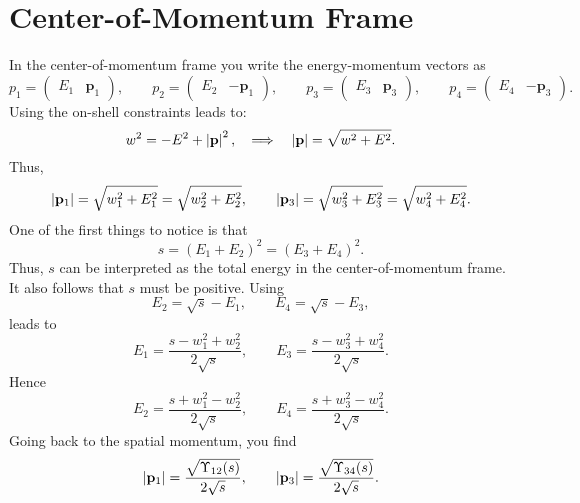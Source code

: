 \section{Center-of-Momentum Frame}
In the center-of-momentum frame you write the energy-momentum vectors as
\begin{equation}
	p_{1} = \begin{pmatrix} E_{1} & \mathbf{p}_{1} \end{pmatrix}, \qquad p_{2} = \begin{pmatrix} E_{2} & -\mathbf{p}_{1} \end{pmatrix}, \qquad p_{3} = \begin{pmatrix} E_{3} & \mathbf{p}_{3} \end{pmatrix}, \qquad p_{4} = \begin{pmatrix} E_{4} & -\mathbf{p}_{3} \end{pmatrix}.
\end{equation}
Using the on-shell constraints leads to:
\begin{equation}
	w^{2} = -E^{2} + \left\lvert \mathbf{p} \right\rvert^{2}, \quad \Longrightarrow \quad \left\lvert \mathbf{p} \right\rvert = \sqrt{w^{2} + E^{2}}.
\end{equation}
Thus,
\begin{equation}
	\left\lvert \mathbf{p}_{1} \right\rvert = \sqrt{w_{1}^{2} + E_{1}^{2}} = \sqrt{w_{2}^{2} + E_{2}^{2}}, \qquad \left\lvert \mathbf{p}_{3} \right\rvert = \sqrt{w_{3}^{2} + E_{3}^{2}} = \sqrt{w_{4}^{2} + E_{4}^{2}}.
\end{equation}
One of the first things to notice is that
\begin{equation}
	s = (E_{1} + E_{2})^{2} = (E_{3} + E_{4})^{2}.
\end{equation}
Thus, $s$ can be interpreted as the total energy in the center-of-momentum frame. It also follows that $s$ must be positive. Using
\begin{equation}
	E_{2} = \sqrt{s} - E_{1}, \qquad E_{4} = \sqrt{s} - E_{3},
\end{equation}
leads to
\begin{equation}
	E_{1} = \frac{s - w_{1}^{2} + w_{2}^{2}}{2 \sqrt{s}} , \qquad E_{3} = \frac{s - w_{3}^{2} + w_{4}^{2}}{2 \sqrt{s}}.
\end{equation}
Hence
\begin{equation}
	E_{2} = \frac{s + w_{1}^{2} - w_{2}^{2}}{2 \sqrt{s}} , \qquad E_{4} = \frac{s + w_{3}^{2} - w_{4}^{2}}{2 \sqrt{s}}.
\end{equation}
Going back to the spatial momentum, you find
\begin{equation}
	\left\lvert \mathbf{p}_{1} \right\rvert = \frac{\sqrt{\Upsilon_{12}(s)}}{2 \sqrt{s}}, \qquad
	\left\lvert \mathbf{p}_{3} \right\rvert = \frac{\sqrt{\Upsilon_{34}(s)}}{2 \sqrt{s}}.
\end{equation}
